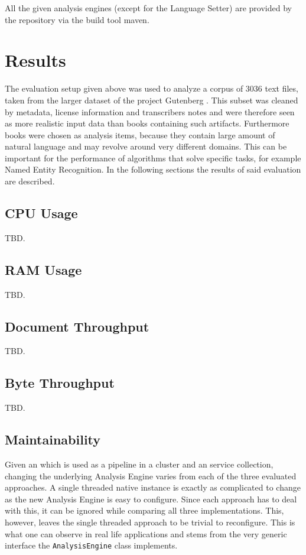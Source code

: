 \begin{itemize}
\begin{enumerate}
	\end{enumerate}
	
\end{itemize}
All the given analysis engines (except for the Language Setter) are provided by the \dkpro{} repository via the build tool maven. 


\section{Results}
The evaluation setup given above was used to analyze a corpus of 3036 text files, taken from the larger dataset of the project Gutenberg \cite{lahiri:2014:SRW}. This subset was cleaned by metadata, license information and transcribers notes and were therefore seen as more realistic input data than books containing such artifacts. Furthermore books were chosen as analysis items, because they contain large amount of natural language and may revolve around very different domains. This can be important for the performance of algorithms that solve specific \nlp{} tasks, for example Named Entity Recognition. In the following sections the results of said evaluation are described.

\subsection{CPU Usage}
TBD.
\subsection{RAM Usage}
TBD.
\subsection{Document Throughput}
TBD.
\subsection{Byte Throughput}
TBD.
\subsection{Maintainability}
Given an \anen{} which is used as a pipeline in a \spark{} cluster and an \uimaas{} service collection, changing the underlying Analysis Engine varies from each of the three evaluated approaches. A single threaded native \uima{} instance is exactly as complicated to change as the new Analysis Engine is easy to configure. Since each approach has to deal with this, it can be ignored while comparing all three implementations. This, however, leaves the single threaded approach to be trivial to reconfigure. This is what one can observe in real life applications and stems from the very generic interface the \lstinline|AnalysisEngine| class implements.

